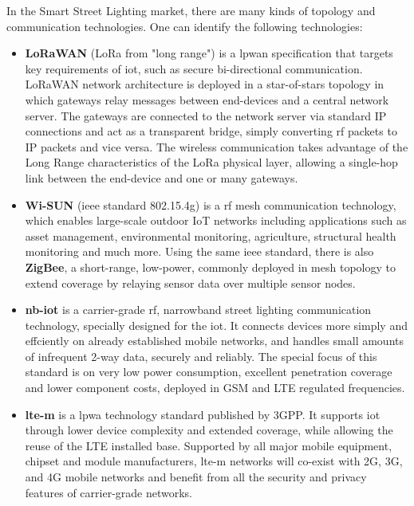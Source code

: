 In the Smart Street Lighting market, there are many kinds of topology and communication technologies. One can identify the following technologies:

\begin{itemize}
	\item \textbf{LoRaWAN} (LoRa from "long range") is a \ac{lpwan} specification that targets key requirements of \ac{iot}, such as secure bi-directional communication. LoRaWAN network architecture is deployed in a star-of-stars topology in which gateways relay messages between end-devices and a central network server. The gateways are connected to the network server via standard IP connections and act as a transparent bridge, simply converting \ac{rf} packets to IP packets and vice versa. The wireless communication takes advantage of the Long Range characteristics of the LoRa physical layer, allowing a single-hop link between the end-device and one or many gateways. \cite{lorawan}
	
	\item \textbf{Wi-SUN} (\ac{ieee} standard 802.15.4g) is a \ac{rf} mesh communication technology, which enables large-scale outdoor IoT networks including applications such as asset management, environmental monitoring, agriculture, structural health monitoring and much more. \cite{wi_sun} Using the same \ac{ieee} standard, there is also \textbf{ZigBee}, a short-range, low-power, commonly deployed in mesh topology to extend coverage by relaying sensor data over multiple sensor nodes. \cite{zigbee}
	
	\item \textbf{\ac{nb-iot}} is a carrier-grade \ac{rf}, narrowband street lighting communication technology, specially designed for the \ac{iot}. It connects devices more simply and effciently on already established mobile networks, and handles small amounts of infrequent 2-way data, securely and reliably. The special focus of this standard is on very low power consumption, excellent penetration coverage and lower component costs, deployed in GSM and LTE regulated frequencies. \cite{nb-iot}
	
	\item \textbf{\ac{lte-m}} is a \ac{lpwa} technology standard published by 3GPP. It supports \ac{iot} through lower device complexity and extended coverage, while allowing the reuse of the LTE installed base. Supported by all major mobile equipment, chipset and module manufacturers, \ac{lte-m} networks will co-exist with 2G, 3G, and 4G mobile networks and benefit from all the security and privacy features of carrier-grade networks. 
	\cite{lte-m}
\end{itemize}

